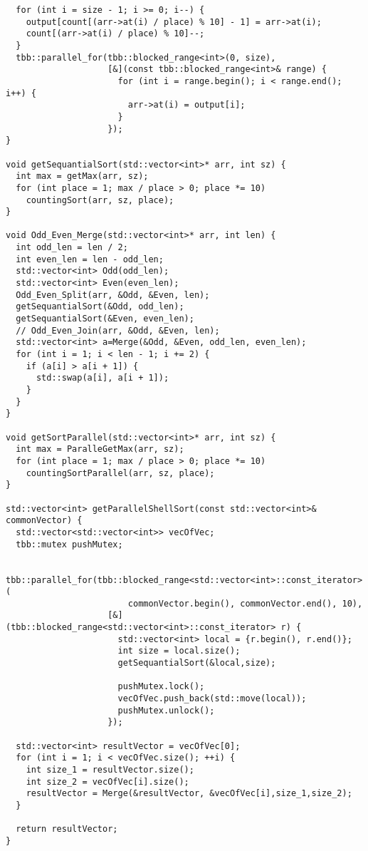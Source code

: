 \documentclass{report}
\begin{document}
\begin{lstlisting}
  for (int i = size - 1; i >= 0; i--) {
    output[count[(arr->at(i) / place) % 10] - 1] = arr->at(i);
    count[(arr->at(i) / place) % 10]--;
  }
  tbb::parallel_for(tbb::blocked_range<int>(0, size),
                    [&](const tbb::blocked_range<int>& range) {
                      for (int i = range.begin(); i < range.end(); i++) {
                        arr->at(i) = output[i];
                      }
                    });
}

void getSequantialSort(std::vector<int>* arr, int sz) {
  int max = getMax(arr, sz);
  for (int place = 1; max / place > 0; place *= 10)
    countingSort(arr, sz, place);
}

void Odd_Even_Merge(std::vector<int>* arr, int len) {
  int odd_len = len / 2;
  int even_len = len - odd_len;
  std::vector<int> Odd(odd_len);
  std::vector<int> Even(even_len);
  Odd_Even_Split(arr, &Odd, &Even, len);
  getSequantialSort(&Odd, odd_len);
  getSequantialSort(&Even, even_len);
  // Odd_Even_Join(arr, &Odd, &Even, len);
  std::vector<int> a=Merge(&Odd, &Even, odd_len, even_len);
  for (int i = 1; i < len - 1; i += 2) {
    if (a[i] > a[i + 1]) {
      std::swap(a[i], a[i + 1]);
    }
  }
}

void getSortParallel(std::vector<int>* arr, int sz) {
  int max = ParalleGetMax(arr, sz);
  for (int place = 1; max / place > 0; place *= 10)
    countingSortParallel(arr, sz, place);
}

std::vector<int> getParallelShellSort(const std::vector<int>& commonVector) {
  std::vector<std::vector<int>> vecOfVec;
  tbb::mutex pushMutex;

  tbb::parallel_for(tbb::blocked_range<std::vector<int>::const_iterator>(
                        commonVector.begin(), commonVector.end(), 10),
                    [&](tbb::blocked_range<std::vector<int>::const_iterator> r) {
                      std::vector<int> local = {r.begin(), r.end()};
                      int size = local.size();
                      getSequantialSort(&local,size);

                      pushMutex.lock();
                      vecOfVec.push_back(std::move(local));
                      pushMutex.unlock();
                    });

  std::vector<int> resultVector = vecOfVec[0];
  for (int i = 1; i < vecOfVec.size(); ++i) {
    int size_1 = resultVector.size();
    int size_2 = vecOfVec[i].size();
    resultVector = Merge(&resultVector, &vecOfVec[i],size_1,size_2);
  }

  return resultVector;
}


\end{lstlisting}
\end{document}
